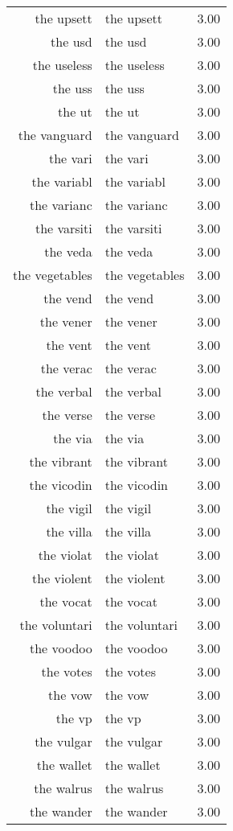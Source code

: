 \begin{table}[ht]
\begin{tabular}{rlr}
  the upsett & the upsett & 3.00 \\ 
  the usd & the usd & 3.00 \\ 
  the useless & the useless & 3.00 \\ 
  the uss & the uss & 3.00 \\ 
  the ut & the ut & 3.00 \\ 
  the vanguard & the vanguard & 3.00 \\ 
  the vari & the vari & 3.00 \\ 
  the variabl & the variabl & 3.00 \\ 
  the varianc & the varianc & 3.00 \\ 
  the varsiti & the varsiti & 3.00 \\ 
  the veda & the veda & 3.00 \\ 
  the vegetables & the vegetables & 3.00 \\ 
  the vend & the vend & 3.00 \\ 
  the vener & the vener & 3.00 \\ 
  the vent & the vent & 3.00 \\ 
  the verac & the verac & 3.00 \\ 
  the verbal & the verbal & 3.00 \\ 
  the verse & the verse & 3.00 \\ 
  the via & the via & 3.00 \\ 
  the vibrant & the vibrant & 3.00 \\ 
  the vicodin & the vicodin & 3.00 \\ 
  the vigil & the vigil & 3.00 \\ 
  the villa & the villa & 3.00 \\ 
  the violat & the violat & 3.00 \\ 
  the violent & the violent & 3.00 \\ 
  the vocat & the vocat & 3.00 \\ 
  the voluntari & the voluntari & 3.00 \\ 
  the voodoo & the voodoo & 3.00 \\ 
  the votes & the votes & 3.00 \\ 
  the vow & the vow & 3.00 \\ 
  the vp & the vp & 3.00 \\ 
  the vulgar & the vulgar & 3.00 \\ 
  the wallet & the wallet & 3.00 \\ 
  the walrus & the walrus & 3.00 \\ 
  the wander & the wander & 3.00 \\ 

\end{tabular}
\end{table}
